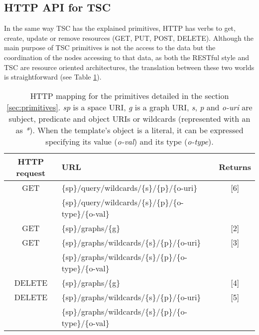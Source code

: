 \subsection{HTTP API for TSC}
In the same way TSC has the explained primitives, HTTP has verbs to get, create, update or remove resources (GET,
PUT, POST, DELETE). Although the main purpose of TSC primitives is not the access to the data but the coordination of
the nodes accessing to that data, as both the RESTful style and TSC are resource oriented architectures, the translation
between these two worlds is straightforward (see Table \ref{tab:otsopackAPI}).


\begin{table} %
\centering
\caption {HTTP mapping for the primitives detailed in the section \ref{sec:primitives}. \textit{sp} is a
space URI, \textit{g} is a graph URI, \textit{s}, \textit{p} and \textit{o-uri} are subject, predicate and object URIs
or wildcards (represented with an as \textit{*}). When the template's object is a literal, it can be expressed
specifying its value (\textit{o-val}) and its type (\textit{o-type}).}
\begin{tabular}{|c|l|c|}
\hline
HTTP request & URL & Returns \\
\hline \hline
GET & \{sp\}/query/wildcards/\{s\}/\{p\}/\{o-uri\} &  [6] \\
 & \{sp\}/query/wildcards/\{s\}/\{p\}/\{o-type\}/\{o-val\} & \\
GET & \{sp\}/graphs/\{g\} & [2] \\
GET & \{sp\}/graphs/wildcards/\{s\}/\{p\}/\{o-uri\} & [3] \\
 & \{sp\}/graphs/wildcards/\{s\}/\{p\}/\{o-type\}/\{o-val\} & \\
DELETE & \{sp\}/graphs/\{g\} & [4] \\
DELETE & \{sp\}/graphs/wildcards/\{s\}/\{p\}/\{o-uri\} & [5] \\
 & \{sp\}/graphs/wildcards/\{s\}/\{p\}/\{o-type\}/\{o-val\} & \\
\hline
\end{tabular}
\label{tab:otsopackAPI}
\end{table}


